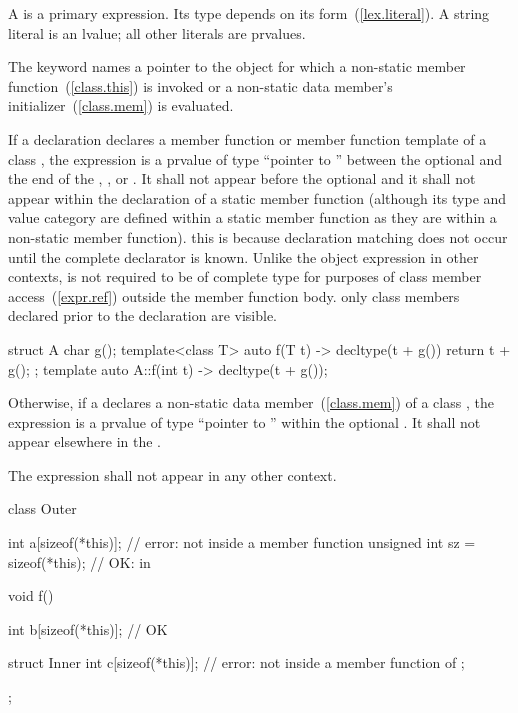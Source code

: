 \pnum
A
%
%
is a primary expression.
Its type depends on its form~(\ref{lex.literal}).
A string literal is an lvalue; all other literals are prvalues.

\pnum
{}%
The keyword  names a pointer to the object for which a non-static member
function~(\ref{class.this}) is invoked or a non-static data member's
initializer~(\ref{class.mem}) is evaluated.

\pnum
If a declaration declares a member function or member function template of a
class , the expression  is a prvalue of type ``pointer to
 '' between the optional
 and the end of the ,
, or . It shall not appear
before the optional  and it shall not appear within
the declaration of a static member function (although its type and value category
are defined within a static member function as they are within a non-static
member function). \enternote this is because declaration matching does not
occur until the complete declarator is known. \exitnote Unlike the object
expression in other contexts,  is not required to be of complete
type for purposes of class member access~(\ref{expr.ref}) outside the member
function body. \enternote only class members declared prior to the declaration
are visible. \exitnote
\enterexample
\begin{codeblock}
struct A {
  char g();
  template<class T> auto f(T t) -> decltype(t + g())
    { return t + g(); }
};
template auto A::f(int t) -> decltype(t + g());
\end{codeblock}
\exitexample

\pnum
Otherwise, if a  declares a non-static data
member~(\ref{class.mem}) of a class , the expression  is
a prvalue of type ``pointer to '' within the
optional . It shall not appear elsewhere
in the .

\pnum
The expression  shall not appear in any other context.
\enterexample
\begin{codeblock}
class Outer {
  int a[sizeof(*this)];               // error: not inside a member function
  unsigned int sz = sizeof(*this);    // OK: in 

  void f() {
    int b[sizeof(*this)];             // OK

    struct Inner {
      int c[sizeof(*this)];           // error: not inside a member function of 
    };
  }
};
\end{codeblock}
\exitexample

